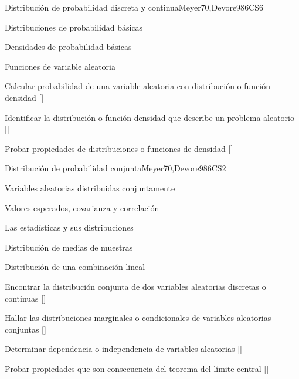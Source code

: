 \begin{syllabus}
\begin{unit}{}{Distribución de probabilidad discreta y continua}{Meyer70,Devore98}{6}{CS6}
\begin{topics}
      \item Distribuciones de probabilidad básicas
      \item Densidades de probabilidad básicas
      \item Funciones de variable aleatoria
   \end{topics}

   \begin{learningoutcomes}
      \item Calcular probabilidad de una variable aleatoria con distribución o función densidad [\Usage]
      \item Identificar la distribución o función densidad que describe un problema aleatorio [\Usage]
      \item Probar propiedades de distribuciones o funciones de densidad [\Usage]
   \end{learningoutcomes}
\end{unit}

\begin{unit}{}{Distribución de probabilidad conjunta}{Meyer70,Devore98}{6}{CS2}
\begin{topics}
      \item Variables aleatorias distribuidas conjuntamente 
      \item Valores esperados, covarianza y correlación
      \item Las estadísticas y sus distribuciones
      \item Distribución de medias de muestras
      \item Distribución de una combinación lineal

   \end{topics}
   \begin{learningoutcomes}
      \item Encontrar la distribución conjunta de dos variables aleatorias discretas o continuas [\Usage]
      \item Hallar las distribuciones marginales o condicionales de variables aleatorias conjuntas [\Usage]
      \item Determinar dependencia o independencia de variables aleatorias [\Usage]
      \item Probar propiedades que son consecuencia del teorema  del límite central [\Usage]
   \end{learningoutcomes}
\end{unit}


\end{syllabus}
